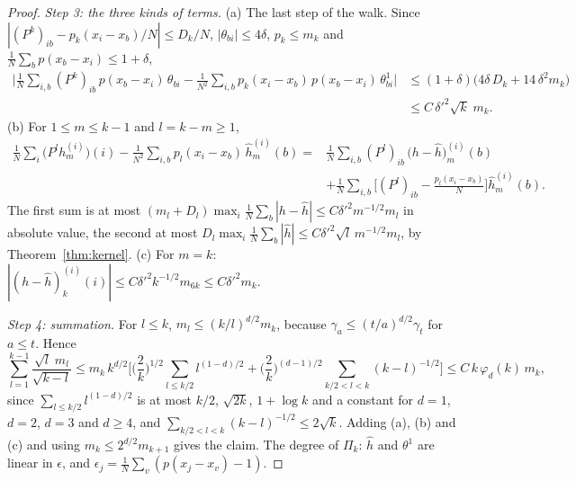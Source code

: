 \begin{proof}
\emph{Step 3: the three kinds of terms.} (a) The last step of the walk. Since $|(P^k)_{ib}-p_k(x_i-x_b)/N|\le D_k/N$, $|\theta_{bi}|\le4\delta$, $p_k\le m_k$ and $\frac1N\sum_bp(x_b-x_i)\le1+\delta$,
\[
\begin{aligned}
\Big|\frac1N\sum_{i,b}(P^k)_{ib}\,p(x_b-x_i)\,\theta_{bi}-\frac1{N^2}\sum_{i,b}p_k(x_i-x_b)\,p(x_b-x_i)\,\theta^1_{bi}\Big|&\le(1+\delta)\big(4\delta\,D_k+14\,\delta^2m_k\big)\\
&\le C\,\delta'^2\sqrt k\;m_k .
\end{aligned}
\]
(b) For $1\le m\le k-1$ and $l=k-m\ge1$,
\[
\begin{aligned}
\frac1N\sum_i\big(P^lh^{(i)}_m\big)(i)-\frac1{N^2}\sum_{i,b}p_l(x_i-x_b)\,\hat h^{(i)}_m(b)
={}&\frac1N\sum_{i,b}(P^l)_{ib}\,\big(h-\hat h\big)^{(i)}_m(b)\\
&+\frac1N\sum_{i,b}\Big[(P^l)_{ib}-\frac{p_l(x_i-x_b)}N\Big]\hat h^{(i)}_m(b).
\end{aligned}
\]
The first sum is at most $(m_l+D_l)\max_i\frac1N\sum_b|h-\hat h|\le C\delta'^2m^{-1/2}m_l$ in absolute value, the second at most $D_l\max_i\frac1N\sum_b|\hat h|\le C\delta'^2\sqrt l\,m^{-1/2}m_l$, by Theorem~\ref{thm:kernel}. (c) For $m=k$: $|(h-\hat h)^{(i)}_k(i)|\le C\delta'^2k^{-1/2}m_{6k}\le C\delta'^2m_k$.

\emph{Step 4: summation.} For $l\le k$, $m_l\le(k/l)^{d/2}m_k$, because $\gamma_a\le(t/a)^{d/2}\gamma_t$ for $a\le t$. Hence
\[
\sum_{l=1}^{k-1}\frac{\sqrt l\;m_l}{\sqrt{k-l}}\le m_k\,k^{d/2}\Big[\Big(\frac2k\Big)^{1/2}\sum_{l\le k/2}l^{(1-d)/2}+\Big(\frac2k\Big)^{(d-1)/2}\sum_{k/2<l<k}(k-l)^{-1/2}\Big]\le C\,k\,\varphi_d(k)\,m_k,
\]
since $\sum_{l\le k/2}l^{(1-d)/2}$ is at most $k/2$, $\sqrt{2k}$, $1+\log k$ and a constant for $d=1$, $d=2$, $d=3$ and $d\ge4$, and $\sum_{k/2<l<k}(k-l)^{-1/2}\le2\sqrt k$. Adding (a), (b) and (c) and using $m_k\le2^{d/2}m_{k+1}$ gives the claim. The degree of $\Pi_k$: $\hat h$ and $\theta^1$ are linear in $\epsilon$, and $\epsilon_j=\frac1N\sum_v(p(x_j-x_v)-1)$.
\end{proof}

